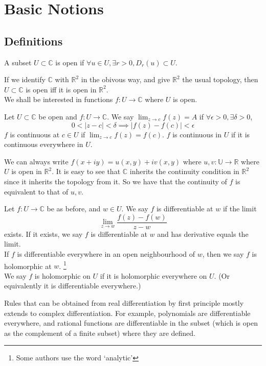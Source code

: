 \section{Basic Notions}
\subsection{Definitions}
\begin{definition}
    A subset $U\subset\mathbb C$ is open if $\forall u\in U,\exists r>0,D_r(u)\subset U$.
\end{definition}
If we identify $\mathbb C$ with $\mathbb R^2$ in the obivous way, and give $\mathbb R^2$ the usual topology, then $U\subset\mathbb C$ is open iff it is open in $\mathbb R^2$.\\
We shall be interested in functions $f:U\to\mathbb C$ where $U$ is open.
\begin{definition}
    Let $U\subset\mathbb C$ be open and $f:U\to\mathbb C$.
    We say $\lim_{z\to c}f(z)=A$ if $\forall\epsilon>0,\exists\delta>0$,
    $$0<|z-c|<\delta\implies |f(z)-f(c)|<\epsilon$$
    $f$ is continuous at $c\in U$ if $\lim_{z\to c}f(z)=f(c)$.
    $f$ is continuous in $U$ if it is continuous everywhere in $U$.
\end{definition}
We can always write $f(x+iy)=u(x,y)+iv(x,y)$ where $u,v:\mathbb U\to\mathbb R$ where $U$ is open in $\mathbb R^2$.
It is easy to see that $\mathbb C$ inherits the continuity condition in $\mathbb R^2$ since it inherits the topology from it.
So we have that the continuity of $f$ is equivalent to that of $u,v$.
\begin{definition}
    Let $f:U\to\mathbb C$ be as before, and $w\in U$.
    We say $f$ is differentiable at $w$ if the limit
    $$\lim_{z\to w}\frac{f(z)-f(w)}{z-w}$$
    exists.
    If it exists, we say $f$ is differentiable at $w$ and has derivative equals the limit.\\
    If $f$ is differentiable everywhere in an open neighbourhood of $w$, then we say $f$ is holomorphic at $w$.
    \footnote{Some authors use the word `analytic'}\\
    We say $f$ is holomorphic on $U$ if it is holomorphic everywhere on $U$.
    (Or equivalently it is differentiable everywhere.)
\end{definition}
Rules that can be obtained from real differentiation by first principle mostly extends to complex differentiation.
For example, polynomials are differentiable everywhere, and rational functions are differentiable in the subset (which is open as the complement of a finite subset) where they are defined.
